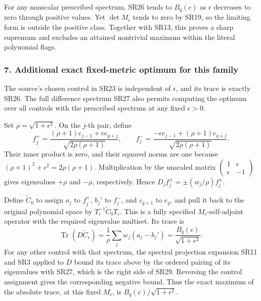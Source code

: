 For any nonscalar prescribed spectrum, SR26 tends to \(B_q(c)\) as \(\epsilon\) decreases to zero through positive values. Yet \(\det M_\epsilon\) tends to zero by SR19, so the limiting form is outside the positive class. Together with SR13, this proves a sharp supremum and excludes an attained nontrivial maximum within the literal polynomial flags.

\subsubsection{7. Additional exact fixed-metric optimum for this family}\label{endpoint-four_window_sharpness_review--additional-exact-fixed-metric-optimum-for-this-family}

The source's chosen control in SR23 is independent of \(\epsilon\), and its trace is exactly SR26. The full difference spectrum SR27 also permits computing the optimum over all controls with the prescribed spectrum at any fixed \(\epsilon>0\).

Set \(\rho=\sqrt{1+\epsilon^2}\). On the \(j\)-th pair, define \[
f_j^+=\frac{(\rho+1)e_{j-1}+\epsilon e_{q+j}}
{\sqrt{2\rho(\rho+1)}},\qquad
f_j^-=\frac{-\epsilon e_{j-1}+(\rho+1)e_{q+j}}
{\sqrt{2\rho(\rho+1)}}.
\tag{SR28}
\] Their inner product is zero, and their squared norms are one because \((\rho+1)^2+\epsilon^2=2\rho(\rho+1)\). Multiplication by the unscaled matrix \(\begin{pmatrix}1&\epsilon\\\epsilon&-1\end{pmatrix}\) gives eigenvalues \(+\rho\) and \(-\rho\), respectively. Hence \(D_j f_j^\pm=\pm(w_j/\rho)f_j^\pm\).

Define \(\widetilde C_0\) to assign \(a_j\) to \(f_j^+\), \(b_j'\) to \(f_j^-\), and \(c_{q+1}\) to \(e_q\), and pull it back to the original polynomial space by \(T_\epsilon^{-1}\widetilde C_0T_\epsilon\). This is a fully specified \(M_\epsilon\)-self-adjoint operator with the required eigenvalue multiset. Its trace is \[
\operatorname{Tr}(D\widetilde C_\epsilon)
=\frac{1}{\rho}\sum_jw_j(a_j-b_j')
=\frac{B_q(c)}{\sqrt{1+\epsilon^2}}.
\tag{SR29}
\] For any other control with that spectrum, the spectral projection expansion SR11 and SR3 applied to \(D\) bound its trace above by the ordered pairing of its eigenvalues with SR27, which is the right side of SR29. Reversing the control assignment gives the corresponding negative bound. Thus the exact maximum of the absolute trace, at this fixed \(M_\epsilon\), is \(B_q(c)/\sqrt{1+\epsilon^2}\).

